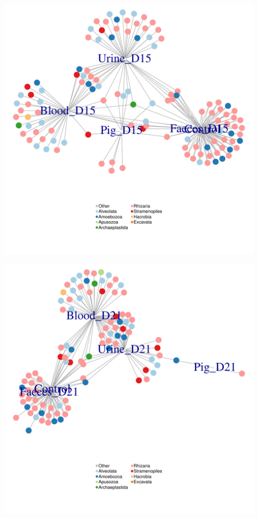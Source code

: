 \documentclass[11pt,english]{article}\usepackage[]{graphicx}\usepackage{xcolor}
\makeatletter
\def\maxwidth{ %
  \ifdim\Gin@nat@width>\linewidth
    \linewidth
  \else
    \Gin@nat@width
  \fi
}
\newenvironment{knitrout}{}{} %
\makeatother
\begin{document}
\begin{knitrout}
\color{fgcolor}
\includegraphics[width=\maxwidth]{figure/image-bioinc_15-1} 

\end{knitrout}

\begin{knitrout}
\color{fgcolor}
\includegraphics[width=\maxwidth]{figure/image-bioinc_21-1} 

\end{knitrout}
\end{document}
